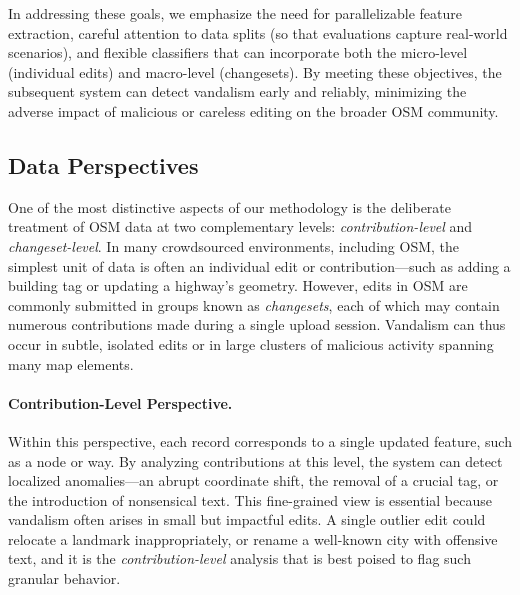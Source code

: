 \documentclass[
    13pt, %
    a4paper, %
    twoside, 
    DIV14, %
    listof=totoc, %
    bibliography=totoc, %
    index=totoc, %
    headsepline
]{scrreprt}
\begin{document}
In addressing these goals, we emphasize the need for parallelizable feature extraction, careful attention to data splits (so that evaluations capture real-world scenarios), and flexible classifiers that can incorporate both the micro-level (individual edits) and macro-level (changesets). By meeting these objectives, the subsequent system can detect vandalism early and reliably, minimizing the adverse impact of malicious or careless editing on the broader OSM community.

\vspace{1em}
\subsection{Data Perspectives}
\label{sec:data_perspectives}

\noindent
One of the most distinctive aspects of our methodology is the deliberate treatment of OSM data at two complementary levels: \emph{contribution-level} and \emph{changeset-level}. In many crowdsourced environments, including OSM, the simplest unit of data is often an individual edit or contribution—such as adding a building tag or updating a highway’s geometry. However, edits in OSM are commonly submitted in groups known as \emph{changesets}, each of which may contain numerous contributions made during a single upload session. Vandalism can thus occur in subtle, isolated edits or in large clusters of malicious activity spanning many map elements.

\paragraph{Contribution-Level Perspective.}
Within this perspective, each record corresponds to a single updated feature, such as a node or way. By analyzing contributions at this level, the system can detect localized anomalies—an abrupt coordinate shift, the removal of a crucial tag, or the introduction of nonsensical text. This fine-grained view is essential because vandalism often arises in small but impactful edits. A single outlier edit could relocate a landmark inappropriately, or rename a well-known city with offensive text, and it is the \emph{contribution-level} analysis that is best poised to flag such granular behavior.
\end{document}
